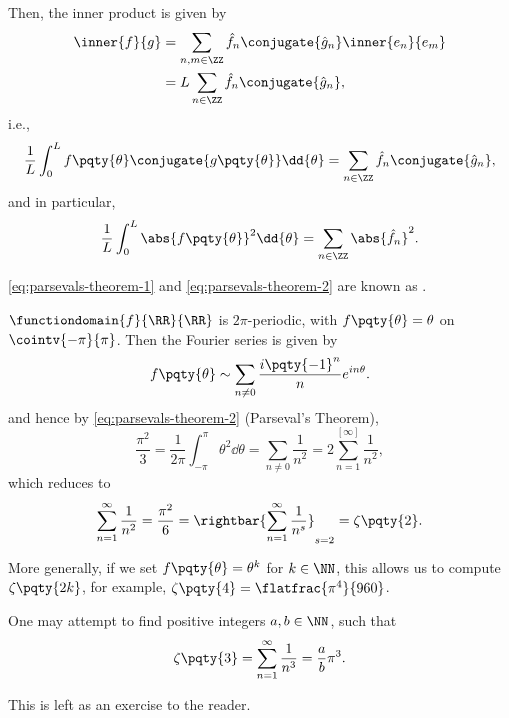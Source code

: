 Then, the inner product is given by
\begin{subequations}
    \begin{align}
        \inner{f}{g} &= \sum_{n, m \in \ZZ} \hat{f}_n \conjugate{\hat{g}_n} \inner{e_n}{e_m} \\
        &= L \sum_{n \in \ZZ} \hat{f}_n \conjugate{\hat{g}_n},
    \end{align}
\end{subequations}
i.e.,
\begin{equation}
    \label{eq:parsevals-theorem-1}%
    \frac{1}{L} \int_{0}^{L} f\pqty{\theta} \conjugate{g\pqty{\theta}} \dd{\theta} = \sum_{n \in \ZZ} \hat{f}_n \conjugate{\hat{g}_n},
\end{equation}
and in particular,
\begin{equation}
    \label{eq:parsevals-theorem-2}%
    \frac{1}{L} \int_{0}^{L} \abs{f\pqty{\theta}}^2 \dd{\theta} = \sum_{n \in \ZZ} \abs{\hat{f}_n}^2.
\end{equation}

\begin{theorem}
    \eqref{eq:parsevals-theorem-1} and \eqref{eq:parsevals-theorem-2} are known as .
\end{theorem}

\begin{example}
    \(\functiondomain{f}{\RR}{\RR}\) is \(2\pi\)-periodic, with \(f\pqty{\theta} = \theta\) on \(\cointv{-\pi}{\pi}\). Then the Fourier series is given by
    \begin{equation}
        f\pqty{\theta} \sim \sum_{n \neq 0} \frac{i \pqty{-1}^n}{n} e^{i n \theta}.
    \end{equation}
    and hence by \eqref{eq:parsevals-theorem-2} (Parseval's Theorem),
    \begin{equation}
        \frac{\pi^2}{3} = \frac{1}{2\pi} \int_{- \pi}^{\pi} \theta^2 \dd{\theta} = \sum_{n \neq 0} \frac{1}{n^2} = 2 \sum_{n = 1}^[\infty] \frac{1}{n^2},
    \end{equation}
    which reduces to
    \begin{equation}
        \sum_{n = 1}^{\infty} \frac{1}{n^2} = \frac{\pi^2}{6} = \rightbar{\sum_{n = 1}^{\infty} \frac{1}{n^s}}_{s = 2} = \zeta\pqty{2}.
    \end{equation}

    More generally, if we set \(f\pqty{\theta} = \theta^k\) for \(k \in \NN\), this allows us to compute \(\zeta\pqty{2k}\), for example, \(\zeta\pqty{4} = \flatfrac{\pi^4}{960}\).
\end{example}

One may attempt to find positive integers \(a, b \in \NN\), such that
\begin{equation}
    \zeta\pqty{3} = \sum_{n = 1}^{\infty} \frac{1}{n^3} = \frac{a}{b} \pi^3.
\end{equation}

This is left as an exercise to the reader.